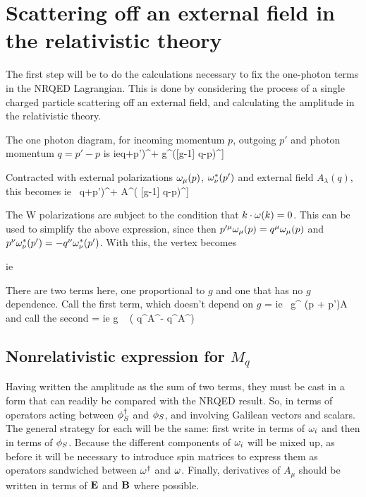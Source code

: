\section{Scattering off an external field in the relativistic theory}


The first step will be to do the calculations necessary to fix the one-photon terms in the NRQED Lagrangian.  This is done by considering the process of a single charged particle scattering off an external field, and calculating the amplitude in the relativistic theory.  

The one photon diagram, for incoming momentum $p$, outgoing $p'$ and photon momentum $q = p' - p$ is  
\beq	
	ie\left[ g^{\mu\nu} (p + p')^\lambda - g^{\nu\lambda}([g-1] q+p')^\mu + g^{\lambda\mu}([g-1] q-p)^\nu \right] 
\eeq

Contracted with external polarizations $\omega_{\mu}(p)$, $\omega^*_{\nu}(p')$ and external field $A_\lambda(q)$, this becomes
\beq
	ie\ \omin{\mu} \omout{\nu} \left[ g^{\mu\nu} (p + p')\cdot A - A^\nu ( [g-1] q+p')^\mu + A^\mu ( [g-1] q-p)^\nu \right]
\eeq

The W polarizations are subject to the condition that $ k \cdot \omega(k) = 0 $.  This can be used to simplify the above expression, since then $p'^\mu \omega_{\mu}(p) = q^\mu \omega_{\mu}(p)$ and $p^\nu \omega^*_{\nu}(p') = -q^\nu \omega^*_{\nu}(p')$.  With this,  the vertex becomes

\beq
	ie\ \omin{\mu} \omout{\nu}  	
\eeq

There are two terms here, one proportional to $g$ and one that has no $g$ dependence.  Call the first term, which doesn't depend on $g$
\beq
	\Mq = ie\ \omin{\mu} \omout{\nu} g^{\mu\nu} (p + p')\cdot A 
\eeq
and call the second 
\beq
	\Mg = ie g  \ \omin{\mu} \omout{\nu}  ( q^\nu A^\mu - q^\mu A^\nu ) 	
\eeq


\subsection{Nonrelativistic expression for $M_q$}

Having written the amplitude as the sum of two terms, they must be cast in a form that can readily be compared with the NRQED result.  So, in terms of operators acting between $\phi_S^\dagger$ and $\phi_S$, and involving Galilean vectors and scalars.  The general strategy for each will be the same: first write in terms of $\omega_i$ and then in terms of $\phi_S$.  Because the different components of $\omega_i$ will be mixed up, as before it will be necessary to introduce spin matrices to express them as operators sandwiched between $\omega^\dagger$ and $\omega$.  Finally, derivatives of $A_\mu$ should be written in terms of $\mathbf{E}$ and $\mathbf{B}$ where possible.



